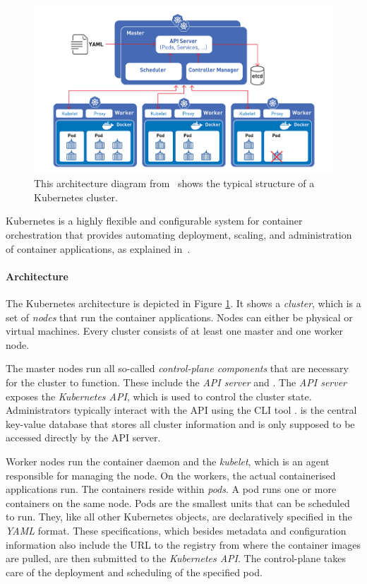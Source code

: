 \begin{figure}[H]
\begin{center}
    \includegraphics[width=0.8\linewidth]{figures/k8s_architecture.png}
    \caption[Kubernetes Architecture]{This architecture diagram from~\textcite{k8sDiagram} shows the typical structure of a Kubernetes cluster.}
    \label{fig:k8sArchitecture}
\end{center}
\end{figure}


Kubernetes is a highly flexible and configurable system for container orchestration that provides automating deployment, scaling, and administration of container applications, as explained in~\textcite{k8sdocs}. 

\paragraph{Architecture}

The Kubernetes architecture is depicted in Figure \ref{fig:k8sArchitecture}. It shows a \textit{cluster}, which is a set of \textit{nodes} that run the container applications. Nodes can either be physical or virtual machines. Every cluster consists of at least one master and one worker node. 

The master nodes run all so-called \textit{control-plane components} that are necessary for the cluster to function. These include the \textit{API server} and . The \textit{API server} exposes the \textit{Kubernetes API}, which is used to control the cluster state. Administrators typically interact with the API using the CLI tool .  is the central key-value database that stores all cluster information and is only supposed to be accessed directly by the API server.

Worker nodes run the container daemon and the \textit{kubelet}, which is an agent responsible for managing the node. On the workers, the actual containerised applications run. The containers reside within \textit{pods}. A pod runs one or more containers on the same node. Pods are the smallest units that can be scheduled to run. They, like all other Kubernetes objects, are declaratively specified in the \textit{YAML} format. These specifications, which besides metadata and configuration information also include the URL to the registry from where the container images are pulled, are then submitted to the \textit{Kubernetes API}. The control-plane takes care of the deployment and scheduling of the specified pod. 

